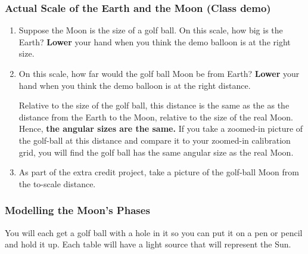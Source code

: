 \documentclass[main.tex]{subfiles}
\begin{document}
\subsubsection{Actual Scale of the Earth and the Moon (Class demo)}
\begin{enumerate}
\item Suppose the Moon is the size of a golf ball. On this scale, how big is the Earth? \textbf{Lower} your hand when you think the demo balloon is at the right size.

\item On this scale, how far would the golf ball Moon be from Earth? \textbf{Lower} your hand when you think the demo balloon is at the right distance.

Relative to the size of the golf ball, this distance is the same as the as the distance from the Earth to the Moon, relative to the size of the real Moon. Hence, \textbf{the angular sizes are the same.} If you take a zoomed-in picture of the golf-ball at this distance and compare it to your zoomed-in calibration grid, you will find the golf ball has the same angular size as the real Moon.

\item As part of the extra credit project, take a picture of the golf-ball Moon from the to-scale distance.
\end{enumerate}

\subsubsection{Modelling the Moon's Phases}
You will each get a golf ball with a hole in it so you can put it on a pen or pencil and hold it up. Each table will have a light source that will represent the Sun.
\end{document}

